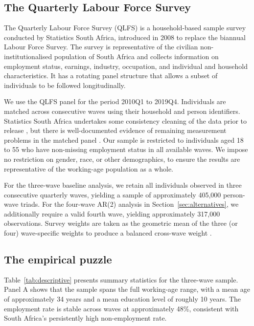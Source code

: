 
\subsection{The Quarterly Labour Force Survey}

The Quarterly Labour Force Survey (QLFS) is a household-based sample survey
conducted by Statistics South Africa, introduced in 2008 to replace the
biannual Labour Force Survey. The survey is representative of the civilian
non-institutionalised population of South Africa and collects information on
employment status, earnings, industry, occupation, and individual and household
characteristics. It has a rotating panel structure that allows a subset of
individuals to be followed longitudinally.

We use the QLFS panel for the period 2010Q1 to 2019Q4. Individuals are matched
across consecutive waves using their household and person identifiers.
Statistics South Africa undertakes some consistency cleaning of the data prior
to release \citep{statssa2013}, but there is well-documented evidence of
remaining measurement problems in the matched panel
\citep{burger2016,lechtenfeld2014}. Our sample is restricted to individuals
aged 18 to 55 who have non-missing employment status in all available waves.
We impose no restriction on gender, race, or other demographics, to ensure
the results are representative of the working-age population as a whole.

For the three-wave baseline analysis, we retain all individuals observed in
three consecutive quarterly waves, yielding a sample of approximately 405,000
person-wave triads. For the four-wave AR(2) analysis in
Section~\ref{sec:alternatives}, we additionally require a valid fourth wave,
yielding approximately 317,000 observations. Survey weights are taken as the
geometric mean of the three (or four) wave-specific weights to produce a
balanced cross-wave weight \citep{kalbfleisch1985}.

\subsection{The empirical puzzle}\label{sec:data:puzzle}

Table~\ref{tab:descriptive} presents summary statistics for the three-wave
sample. Panel A shows that the sample spans the full working-age range, with
a mean age of approximately 34 years and a mean education level of roughly
10 years. The employment rate is stable across waves at approximately 48\%,
consistent with South Africa's persistently high non-employment rate.

